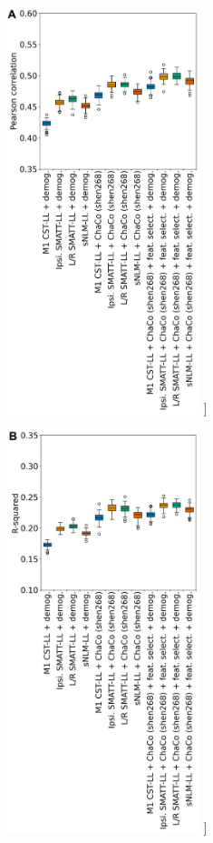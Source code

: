 \documentclass[phd,tocprelim]{cornell}
\renewcommand{\caption}[1]{\singlespacing\hangcaption{#1}\normalspacing}
\begin{document}
\null
\vfill
\clearpage
\null
\vfill
\begin{figure}[h!]
		\ContinuedFloat
		\captionsetup{labelformat=adja-page}
    \centering
    \includegraphics[width=0.5\textwidth]{chapter3/Figure3A.png}
    \caption[]{}
\end{figure}
\null
\vfill
\clearpage
\null
\vfill
\begin{figure}[h!]
		\ContinuedFloat
		\captionsetup{labelformat=adja-page}
    \centering
    \includegraphics[width=0.5\textwidth]{chapter3/Figure3B.png}
    \caption[]{}
\end{figure}
\end{document}
